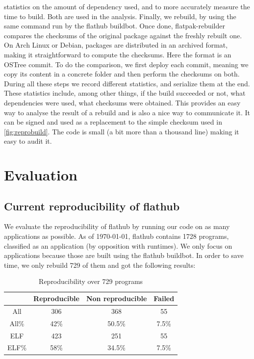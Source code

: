 \documentclass[a4paper,11pt,oneside]{report}
\theoremstyle{definition}
\newcommand{\sysname}{flatpak-rebuilder\xspace}
\newcommand{\fh}{flathub\xspace}
\newcommand{\fhbb}{flathub buildbot\xspace}
\begin{document}
statistics on the amount of dependency used, and to more accurately measure the
time to build. Both are used in the analysis. Finally, we rebuild, by using the
same command run by the \fhbb. Once done, \sysname compares the checksums of
the original package against the freshly rebuilt one. On Arch Linux or Debian,
packages are distributed in an archived format, making it straightforward to
compute the checksums. Here the format is an OSTree commit. To do the
comparison, we first deploy each commit, meaning we copy its content in a
concrete folder and then perform the checksums on both. During all these steps
we record different statistics, and serialize them at the end. These statistics
include, among other things, if the build succeeded or not, what dependencies
were used, what checksums were obtained. This provides an easy way to analyse
the result of a rebuild and is also a nice way to communicate it. It can be
signed and used as a replacement to the simple checksum used in
\autoref{fig:reprobuild}. The code is small (a bit more than a thousand line)
making it easy to audit it.

\chapter{Evaluation}

\section{Current reproducibility of \fh}
\label{sec:cr}
We evaluate the reproducibility of \fh by running our code on as many
applications as possible. As of \today, \fh contains 1728 programs, classified
as an application (by opposition with runtimes). We only focus on applications
because those are built using the \fhbb. In order to save time, we only rebuild
729 of them and got the following results:

\begin{table}[h]
    \centering
        \begin{tabular}{|c|c|c|c|}
            \hline
            & Reproducible & Non reproducible & Failed\\
            \hline
            All & 306 & 368 & 55\\
            \hline
            All\% & 42\% & 50.5\% & 7.5\% \\
            \hline
            ELF & 423 & 251 & 55\\
            \hline
            ELF\% & 58\% & 34.5\% & 7.5\% \\
            \hline
        \end{tabular}
    \caption{Reproducibility over 729 programs}
    \label{tab:rebuild-all}
\end{table}
\end{document}
